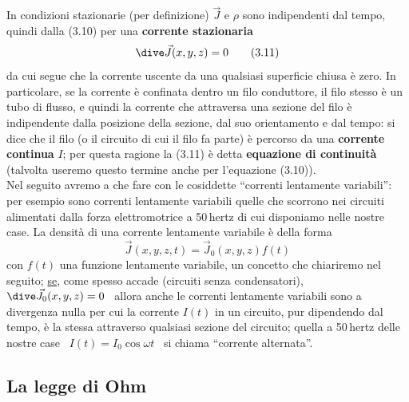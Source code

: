 In condizioni stazionarie (per definizione) $\vec J$ e $\rho$ sono indipendenti
dal tempo, quindi dalla (3.10) per una \textbf{corrente stazionaria}
\begin{equation}
  \dive\vec J(x,y,z)=0
  \tag{3.11}
\end{equation}
da cui segue che la corrente uscente da una qualsiasi superficie chiusa \`e
zero. In particolare, se la corrente \`e confinata dentro un filo conduttore, il
filo stesso \`e un tubo di flusso, e quindi la corrente che attraversa una
sezione del filo \`e indipendente dalla posizione della sezione, dal suo
orientamento e dal tempo: si dice che il filo (o il circuito di cui il filo fa
parte) \`e percorso da una \textbf{corrente continua} $I$; per questa ragione la
(3.11) \`e detta \textbf{equazione di continuit\`a} \big(talvolta useremo questo
termine anche per l'equazione (3.10)\big).\\
Nel seguito avremo a che fare con le cosiddette ``correnti lentamente
variabili'': per esempio sono correnti lentamente variabili quelle che scorrono
nei circuiti alimentati dalla forza elettromotrice a 50\,hertz di cui disponiamo
nelle nostre case. La densit\`a di una corrente lentamente variabile \`e della
forma
\begin{equation}
  \vec J(x,y,z,t)=\vec J_0(x,y,z)f(t)
  \tag{3.12}
\end{equation}
con $f(t)$ una funzione lentamente variabile, un concetto che chiariremo nel
seguito; \underline{se}, come spesso accade (circuiti senza condensatori),
\ $\dive\vec J_0(x,y,z)=0$ \ allora anche le correnti lentamente variabili sono
a divergenza nulla per cui la corrente $I(t)$ in un circuito, pur dipendendo dal
tempo, \`e la stessa attraverso qualsiasi sezione del circuito; quella a
50\,hertz delle nostre case \ $I(t)=I_0\cos\omega t$ \ si chiama ``corrente
alternata''.

\subsection{La legge di Ohm}


